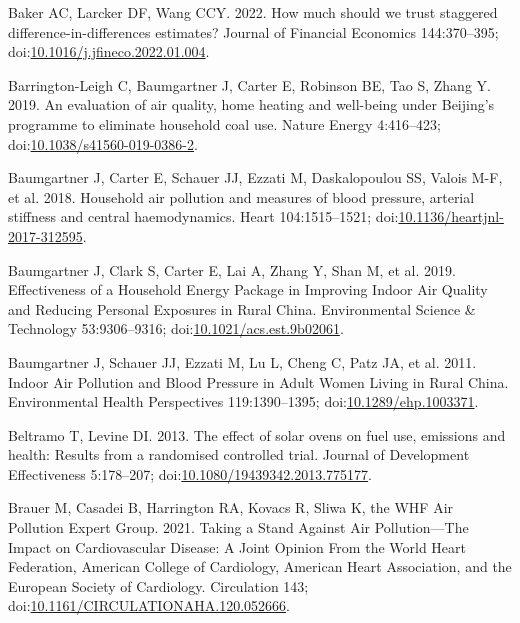 \documentclass[
  letterpaper,
  DIV=11,
  numbers=noendperiod]{scrartcl}
\newlength{\cslhangindent}
\newenvironment{CSLReferences}[2] %
 {\begin{list}{}{%
  \setlength{\itemindent}{0pt}
  \setlength{\leftmargin}{0pt}
  \setlength{\parsep}{0pt}
  \ifodd #1
   \setlength{\leftmargin}{\cslhangindent}
   \setlength{\itemindent}{-1\cslhangindent}
  \fi
  \setlength{\itemsep}{#2\baselineskip}}}
 {\end{list}}
\begin{document}
\begin{CSLReferences}{1}{1}
Baker AC, Larcker DF, Wang CCY. 2022. How much should we trust staggered
difference-in-differences estimates? Journal of Financial Economics
144:370--395;
doi:\href{https://doi.org/10.1016/j.jfineco.2022.01.004}{10.1016/j.jfineco.2022.01.004}.

Barrington-Leigh C, Baumgartner J, Carter E, Robinson BE, Tao S, Zhang
Y. 2019. An evaluation of air quality, home heating and well-being under
{Beijing}'s programme to eliminate household coal use. Nature Energy
4:416--423;
doi:\href{https://doi.org/10.1038/s41560-019-0386-2}{10.1038/s41560-019-0386-2}.

Baumgartner J, Carter E, Schauer JJ, Ezzati M, Daskalopoulou SS, Valois
M-F, et al. 2018. Household air pollution and measures of blood
pressure, arterial stiffness and central haemodynamics. Heart
104:1515--1521;
doi:\href{https://doi.org/10.1136/heartjnl-2017-312595}{10.1136/heartjnl-2017-312595}.

Baumgartner J, Clark S, Carter E, Lai A, Zhang Y, Shan M, et al. 2019.
Effectiveness of a {Household Energy Package} in {Improving Indoor Air
Quality} and {Reducing Personal Exposures} in {Rural China}.
Environmental Science \& Technology 53:9306--9316;
doi:\href{https://doi.org/10.1021/acs.est.9b02061}{10.1021/acs.est.9b02061}.

Baumgartner J, Schauer JJ, Ezzati M, Lu L, Cheng C, Patz JA, et al.
2011. Indoor {Air Pollution} and {Blood Pressure} in {Adult Women
Living} in {Rural China}. Environmental Health Perspectives
119:1390--1395;
doi:\href{https://doi.org/10.1289/ehp.1003371}{10.1289/ehp.1003371}.

Beltramo T, Levine DI. 2013. The effect of solar ovens on fuel use,
emissions and health: Results from a randomised controlled trial.
Journal of Development Effectiveness 5:178--207;
doi:\href{https://doi.org/10.1080/19439342.2013.775177}{10.1080/19439342.2013.775177}.

Brauer M, Casadei B, Harrington RA, Kovacs R, Sliwa K, the WHF Air
Pollution Expert Group. 2021. Taking a {Stand Against Air
Pollution}---{The Impact} on {Cardiovascular Disease}: {A Joint Opinion
From} the {World Heart Federation}, {American College} of {Cardiology},
{American Heart Association}, and the {European Society} of
{Cardiology}. Circulation 143;
doi:\href{https://doi.org/10.1161/CIRCULATIONAHA.120.052666}{10.1161/CIRCULATIONAHA.120.052666}.


\end{CSLReferences}
\end{document}
